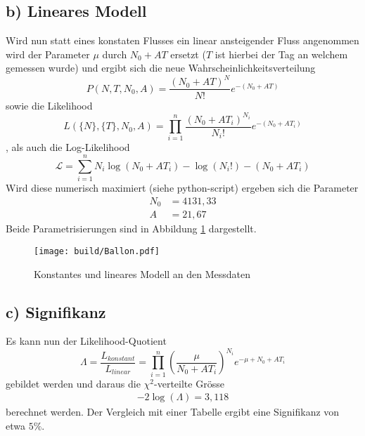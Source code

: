 \subsection*{b) Lineares Modell}
Wird nun statt eines konstaten Flusses ein linear ansteigender Fluss angenommen wird der Parameter $\mu$ durch $N_0+AT$ ersetzt ($T$ ist hierbei der Tag an welchem gemessen wurde)
und ergibt sich die neue Wahrscheinlichkeitsverteilung
\begin{equation}
    P(N,T,N_0,A)=\frac{(N_0+AT)^N}{N!}e^{-(N_0+AT)}
\end{equation}
sowie die Likelihood
\begin{equation}
    L(\{N\},\{T\},N_0,A)=\prod_{i=1}^n \frac{(N_0+AT_i)^{N_i}}{N_i!}e^{-(N_0+AT_i)}
\end{equation}
, als  auch die Log-Likelihood
\begin{equation}
    \mathcal{L}=\sum_{i=1}^n N_i\log(N_0+AT_i)-\log(N_i!)-(N_0+AT_i)
\end{equation}
Wird diese numerisch maximiert (siehe python-script) ergeben sich die Parameter
\begin{align}
    N_0 &= 4131,33\\
    A   &= 21,67
\end{align}
Beide Parametrisierungen sind in Abbildung \ref{fig:Ballon} dargestellt.
\begin{figure}
    \centering
    \texttt{[image: build/Ballon.pdf]}
    \caption{Konstantes und lineares Modell an den Messdaten}
    \label{fig:Ballon}
\end{figure}
\subsection*{c) Signifikanz}
Es kann nun der Likelihood-Quotient
\begin{equation}
    \Lambda=\frac{L_{konstant}}{L_{linear}}=\prod_{i=1}^n \left(\frac{\mu}{N_0+AT_i}\right)^{N_i} e^{-\mu+N_0+AT_i}
\end{equation}
gebildet werden und daraus die $\chi^2$-verteilte Grösse
\begin{align}
    -2\log(\Lambda)=3,118
\end{align}
berechnet werden. Der Vergleich mit einer Tabelle ergibt eine Signifikanz von etwa $5\%$.

